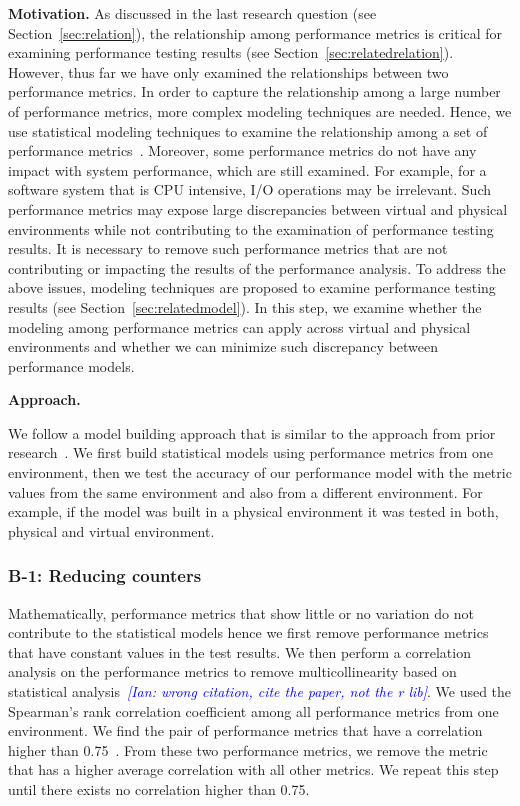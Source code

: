 \documentclass[smallextended]{svjour3}       %
\newcommand{\ian}[1]{\textcolor{blue}{{\it [Ian: #1]}}}
\begin{document}
\noindent \textbf{Motivation.}
As discussed in the last research question (see Section~\ref{sec:relation}), the relationship among performance metrics is critical for examining performance testing results (see Section~\ref{sec:relatedrelation}). However, thus far we have only examined the relationships between two performance metrics. In order to capture the relationship among a large number of performance metrics, more complex modeling techniques are needed. Hence, we use statistical modeling techniques to examine the relationship among a set of performance metrics~\cite{xiong2013vperfguard,cohen2004correlating}. Moreover, some performance metrics do not have any impact with system performance, which are still examined. For example, for a software system that is CPU intensive, I/O operations may be irrelevant. Such performance metrics may expose large discrepancies between virtual and physical environments while not contributing to the examination of performance testing results. It is necessary to remove such performance metrics that are not contributing or impacting the results of the performance analysis. To address the above issues, modeling techniques are proposed to examine performance testing results (see Section~\ref{sec:relatedmodel}). In this step, we examine whether the modeling among performance metrics can apply across virtual and physical environments and whether we can minimize such discrepancy between performance models.


\noindent \textbf{Approach. }

We follow a model building approach that is similar to the approach from prior research~\cite{Shang:2015:ADP:2668930.2688052,Cohen:2005:CIC:1095810.1095821,xiong2013vperfguard}. We first build statistical models using performance metrics from one environment, then we test the accuracy of our performance model with the metric values from the same environment and also from a different environment. For example, if the model was built in a physical environment it was tested in both, physical and virtual environment.

\subsubsection{B-1: Reducing counters}

Mathematically, performance metrics that show little or no variation do not contribute to the statistical models hence we first remove performance metrics that have constant values in the test results. We then perform a correlation analysis on the performance metrics to remove multicollinearity based on statistical analysis~\cite{cor_R}\ian{wrong citation, cite the paper, not the r lib}. We used the Spearman's rank correlation coefficient among all performance metrics from one environment. We find the pair of performance metrics that have a correlation higher than 0.75~\cite{Syer2016}. From these two performance metrics, we remove the metric that has a higher average correlation with all other metrics. We repeat this step until there exists no correlation higher than 0.75.
\end{document}
